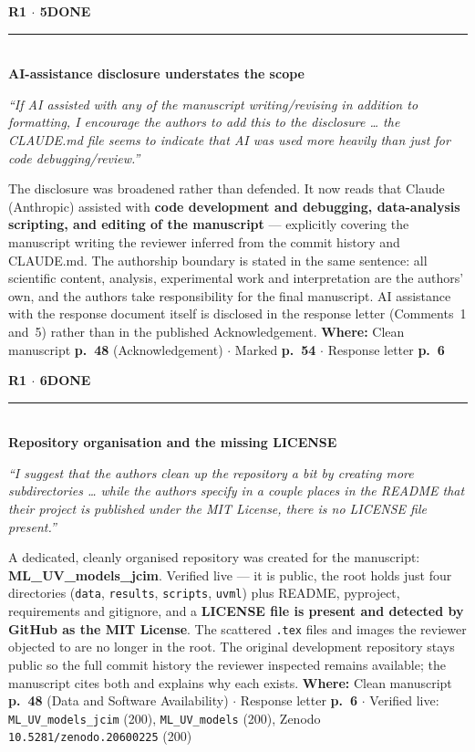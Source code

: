 \documentclass[11pt]{article}
\newcommand{\itemhead}[4]{%
  \needspace{4\baselineskip}%
  \vspace{0.5em}%
  {\bfseries\color{accent}#1}\hfill{\small\bfseries\color{#3}\MakeUppercase{#2}}\\[-0.4em]
  \textcolor{rulegrey}{\rule{\linewidth}{0.4pt}}\\[-0.2em]
  {\bfseries #4}\par\vspace{-0.15em}%
}
\newcommand{\quo}[1]{{\small\itshape\color{inkmute}``#1''}\par}
\newcommand{\where}[1]{%
  \vspace{0.15em}%
  {\small\textcolor{inkmute}{\textbf{Where:}} #1}\par
}
\begin{document}
\itemhead{R1 $\cdot$ 5}{done}{done}{AI-assistance disclosure understates the scope}
\quo{If AI assisted with any of the manuscript writing/revising in addition to formatting, I encourage the authors to add this to the disclosure \ldots{} the CLAUDE.md file seems to indicate that AI was used more heavily than just for code debugging/review.}
The disclosure was broadened rather than defended. It now reads that Claude (Anthropic) assisted with
\textbf{code development and debugging, data-analysis scripting, and editing of the manuscript} ---
explicitly covering the manuscript writing the reviewer inferred from the commit history and CLAUDE.md.
The authorship boundary is stated in the same sentence: all scientific content, analysis, experimental work
and interpretation are the authors' own, and the authors take responsibility for the final manuscript.
AI assistance with the response document itself is disclosed in the response letter (Comments~1 and~5)
rather than in the published Acknowledgement.
\where{Clean manuscript \textbf{p.~48} (Acknowledgement) $\cdot$ Marked \textbf{p.~54} $\cdot$
Response letter \textbf{p.~6}}

\itemhead{R1 $\cdot$ 6}{done}{done}{Repository organisation and the missing LICENSE}
\quo{I suggest that the authors clean up the repository a bit by creating more subdirectories \ldots{} while the authors specify in a couple places in the README that their project is published under the MIT License, there is no LICENSE file present.}
A dedicated, cleanly organised repository was created for the manuscript: \textbf{ML\_UV\_models\_jcim}.
Verified live --- it is public, the root holds just four directories (\texttt{data}, \texttt{results},
\texttt{scripts}, \texttt{uvml}) plus README, pyproject, requirements and gitignore, and a \textbf{LICENSE
file is present and detected by GitHub as the MIT License}. The scattered \texttt{.tex} files and images the
reviewer objected to are no longer in the root. The original development repository stays public so the full
commit history the reviewer inspected remains available; the manuscript cites both and explains why each
exists.
\where{Clean manuscript \textbf{p.~48} (Data and Software Availability) $\cdot$ Response letter \textbf{p.~6}
$\cdot$ Verified live: \texttt{ML\_UV\_models\_jcim} (200), \texttt{ML\_UV\_models} (200),
Zenodo \texttt{10.5281/zenodo.20600225} (200)}
\end{document}
